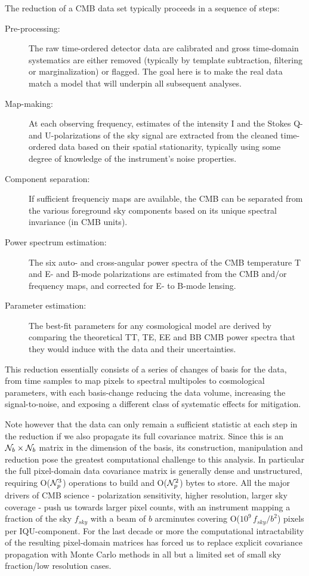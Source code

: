 The reduction of a CMB data set typically proceeds in a sequence of steps:
\begin{description}
\item[ Pre-processing:] The raw time-ordered detector data are calibrated and gross time-domain systematics are either removed (typically by template subtraction, filtering or marginalization) or flagged. The goal here is to make the real data match a model that will underpin all subsequent analyses.
\item[Map-making:] At each observing frequency, estimates of the intensity I and the Stokes Q- and U-polarizations of the sky signal are extracted from the cleaned time-ordered data based on their spatial stationarity, typically using some degree of knowledge of the instrument's noise properties.
\item[Component separation:] If sufficient frequenciy maps are available, the CMB can be separated from the various foreground sky components based on its unique spectral invariance (in CMB units).
\item[Power spectrum estimation:] The six auto- and cross-angular power spectra of the CMB temperature T and E- and B-mode polarizations are estimated from the CMB and/or frequency maps, and corrected for E- to B-mode lensing.
\item[Parameter estimation:] The best-fit parameters for any cosmological model are derived by comparing the theoretical TT, TE, EE and BB CMB power spectra that they would induce with the data and their uncertainties.
\end{description}

This reduction essentially consists of a series of changes of basis for the data, from time samples to map pixels to spectral multipoles to cosmological parameters, with each basis-change reducing the data volume, increasing the signal-to-noise, and exposing a different class of systematic effects for mitigation.

Note however that the data can only remain a sufficient statistic at each step in the reduction if we also propagate its full covariance matrix. Since this is an ${\cal N}_b \times {\cal N}_b$ matrix in the dimension of the basis, its construction, manipulation and reduction pose the greatest computational challenge to this analysis. In particular the full pixel-domain data covariance matrix is generally dense and unstructured, requiring O(${\cal N}_p^3$) operations to build and O(${\cal N}_p^2$) bytes to store. All the major drivers of CMB science - polarization sensitivity, higher resolution, larger sky coverage - push us towards larger pixel counts, with an instrument mapping a fraction of the sky $f_{sky}$ with a beam of $b$ arcminutes covering O($10^9 \, f_{sky}/b^2$) pixels per IQU-component. For the last decade or more the computational intractability of the resulting pixel-domain matrices has forced us to replace explicit covariance propagation with Monte Carlo methods in all but a limited set of small sky fraction/low resolution cases.

